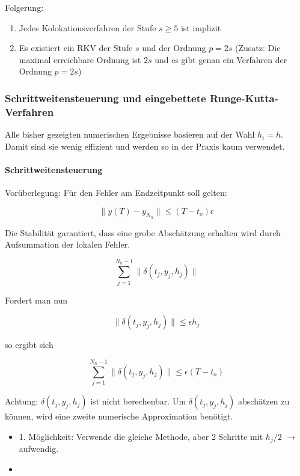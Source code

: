 Folgerung: 
\begin{enumerate}
	\item Jedes Kolokationsverfahren der Stufe $s \ge 5$ ist implizit
	\item Es existiert ein RKV der Stufe $s$ und der Ordnung $p=2s$ (Zusatz: Die maximal erreichbare Ordnung ist $2s$ und es gibt genau ein Verfahren der Ordnung $p=2s$)
\end{enumerate}

\subsubsection{Schrittweitensteuerung und eingebettete Runge-Kutta-Verfahren}

Alle bisher gezeigten numerischen Ergebnisse basieren auf der Wahl $h_i = h$. Damit sind sie wenig effizient und werden so in der Praxis kaum verwendet.

\paragraph{Schrittweitensteuerung}

Vorüberlegung: Für den Fehler am Endzeitpunkt soll gelten:

$$\|y(T) - y_{N_h}\| \le (T-t_o)\epsilon$$

Die Stabilität garantiert, dass eine grobe Abschätzung erhalten wird durch Aufsummation der lokalen Fehler.

$$\sum_{j=1}^{N_h-1} \| \delta(t_j, y_j, h_j) \|$$

Fordert man nun 

$$\|\delta(t_j, y_j, h_j)\| \le \epsilon h_j$$

so ergibt sich

$$\sum_{j=1}^{N_h-1} \|\delta(t_j, y_j, h_j)\| \le \epsilon (T-t_o)$$

Achtung: $\delta(t_j, y_j, h_j)$ ist nicht berechenbar. Um $\delta(t_j, y_j, h_j)$ abschätzen zu können, wird eine zweite numerische Approximation benötigt.

\begin{itemize}
	\item 1. Möglichkeit: Verwende die gleiche Methode, aber 2 Schritte mit $h_j/2$ $\rightarrow$ aufwendig.
	\item
\end{itemize}


